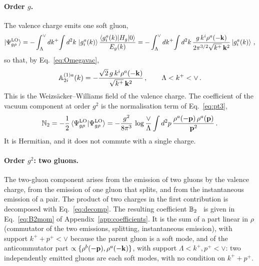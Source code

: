 \paragraph{Order $g$.} The valence charge emits one soft gluon,
\begin{align}\label{eq:PsiLO}
\ket{\Psi^{\rm LO}_{g\rho}}=-\int_\Lambda^\vee dk^+\!\int d^2k\,\ket{g^a_i(k)}\frac{\braket{g^a_i(k)|H_g|0}}{E_g(k)}
=-\int_\Lambda^\vee dk^+\!\int d^2k\,\frac{g\,k^i\rho^a(-\mathbf{k})}{2\pi^{3/2}\sqrt{k^+}\,\mathbf{k}^2}\ket{g^a_i(k)}\,,
\end{align}
so that, by Eq.~\eqref{eq:Omegavac},
\begin{align}\label{eq:A1mom}
\mathbb{A}^{(1)a}_{2i}(k)=-\frac{\sqrt2\,g\,k^i\rho^a(-\mathbf{k})}{\sqrt{k^+}\,\mathbf{k}^2}\,,\qquad \Lambda<k^+<\vee\,.
\end{align}
This is the Weizs\"acker--Williams field of the valence charge. The coefficient of the vacuum component at order $g^2$ is the normalisation term of Eq.~\eqref{eq:pt3},
\begin{align}\label{eq:N2mom}
\mathbb{N}_2=-\frac12\braket{\Psi^{\rm LO}_{g\rho}|\Psi^{\rm LO}_{g\rho}}=-\frac{g^2}{8\pi^3}\,\log\frac{\vee}{\Lambda}\int d^2p\,\frac{\rho^a(-\mathbf{p})\,\rho^a(\mathbf{p})}{\mathbf{p}^2}\,.
\end{align}
It is Hermitian, and it does not commute with a single charge.

\paragraph{Order $g^2$: two gluons.} The two-gluon component arises from the emission of two gluons by the valence charge, from the emission of one gluon that splits, and from the instantaneous emission of a pair. The product of two charges in the first contribution is decomposed with Eq.~\eqref{eq:decomp}. The resulting coefficient $\mathbb{B}_2$~\cite{Lublinsky:2016meo} is given in Eq.~\eqref{eq:B2mom} of Appendix~\ref{app:coefficients}. It is the sum of a part linear in $\rho$ (commutator of the two emissions, splitting, instantaneous emission), with support $k^++p^+<\vee$ because the parent gluon is a soft mode, and of the anticommutator part $\propto\{\rho^b(-\mathbf{p}),\rho^a(-\mathbf{k})\}$, with support $\Lambda<k^+,p^+<\vee$: two independently emitted gluons are each soft modes, with no condition on $k^++p^+$.


